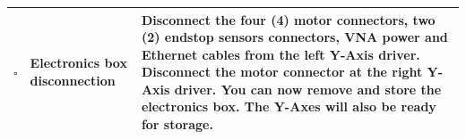 \documentclass{article}
\begin{document}
\begin{onehalfspacing}
\begin{xltabular}{\textwidth}{|c|p{4cm}|X|}
    $\square$ & Electronics box disconnection & Disconnect the four (4) motor connectors, two (2) endstop sensors connectors, VNA power and Ethernet cables from the left Y-Axis driver. Disconnect the motor connector at the right Y-Axis driver. You can now remove and store the electronics box. The Y-Axes will also be ready for storage. \\ \hline
\end{xltabular}
\end{onehalfspacing}
\end{document}
